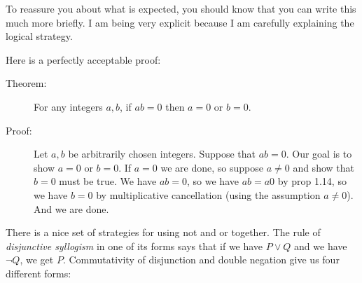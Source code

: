 \documentclass[12pt]{article}
\begin{document}
To reassure you about what is expected, you should know that you can write this much more briefly.  I am being very explicit because I am carefully explaining the logical strategy.

Here is a perfectly acceptable proof:

\begin{description}

\item[Theorem:]  For any integers $a,b$, if $ab=0$ then $a=0$ or $b=0$.

\item[Proof:]  Let $a,b$ be arbitrarily chosen integers.  Suppose that $ab=0$.  Our goal is to show $a=0$ or $b=0$.
If $a=0$ we are done, so suppose $a \neq 0$ and show that $b=0$ must be true.   We have $ab=0$, so we have $ab=a0$ by prop 1.14, so we have $b=0$ by multiplicative cancellation (using the assumption $a\neq 0$).  And we are done.

\end{description}

There is a nice set of strategies for using not and or together.  The rule of {\em disjunctive syllogism\/} in one of its forms says that if we have $P \vee Q$ and we have $\neg Q$, we get $P$.  Commutativity of disjunction and double negation give us four different forms:
\end{document}
